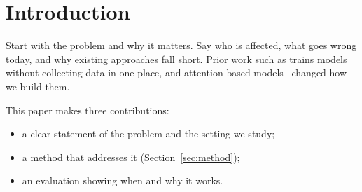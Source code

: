 \section{Introduction}
\label{sec:intro}

Start with the problem and why it matters. Say who is affected, what goes
wrong today, and why existing approaches fall short. Prior work such as
\cite{mcmahan2017communication} trains models without collecting data in one
place, and attention-based models~\cite{vaswani2017attention} changed how we
build them.

This paper makes three contributions:
\begin{itemize}
  \item a clear statement of the problem and the setting we study;
  \item a method that addresses it (Section~\ref{sec:method});
  \item an evaluation showing when and why it works.
\end{itemize}
